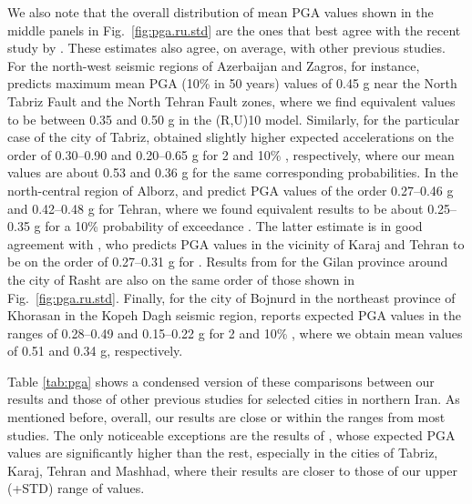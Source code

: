 We also note that the overall distribution of mean PGA values shown in the middle panels in Fig.~\ref{fig:pga.ru.std} are the ones that best agree with the recent study by \citet{Khodaverdian_2016_BSSA}. These estimates also agree, on average, with other previous studies. For the north-west seismic regions of Azerbaijan and Zagros, for instance, \citet{Tavakoli1999} predicts maximum mean PGA (10\% in 50 years) values of 0.45 g near the North Tabriz Fault and the North Tehran Fault zones, where we find equivalent values to be between 0.35 and 0.50 g in the (R,U)10 model. Similarly, for the particular case of the city of Tabriz, \citet{Vafaie2011} obtained slightly higher expected accelerations on the order of 0.30--0.90 and 0.20--0.65 g for 2 and 10\% , respectively, where our mean values are about 0.53 and 0.36 g for the same corresponding probabilities. In the north-central region of Alborz, \citet{Ghodrati2003} and \citet{Boostan2015} predict PGA values of the order 0.27--0.46 g and 0.42--0.48 g for Tehran, where we found equivalent results to be about 0.25--0.35 g for a 10\% probability of exceedance . The latter estimate is in good agreement with \citet{Abdi2013}, who predicts PGA values in the vicinity of Karaj and Tehran to be on the order of 0.27--0.31 g for . Results from \citet{Ghodrati2008} for the Gilan province around the city of Rasht are also on the same order of those shown in Fig.~\ref{fig:pga.ru.std}. Finally, for the city of Bojnurd in the northeast province of Khorasan in the Kopeh Dagh seismic region, \citet{Rahgozar2012} reports expected PGA values in the ranges of 0.28--0.49 and 0.15--0.22 g for 2 and 10\% , where we obtain mean values of 0.51 and 0.34 g, respectively.

Table \ref{tab:pga} shows a condensed version of these comparisons between our results and those of other previous studies for selected cities in northern Iran. As mentioned before, overall, our results are close  or within the ranges from most studies. The only noticeable exceptions are the results of \citet{Golara2014}, whose expected PGA values are significantly higher than the rest, especially in the cities of Tabriz, Karaj, Tehran and Mashhad, where their results are closer to those of our upper (+STD) range of values. 



